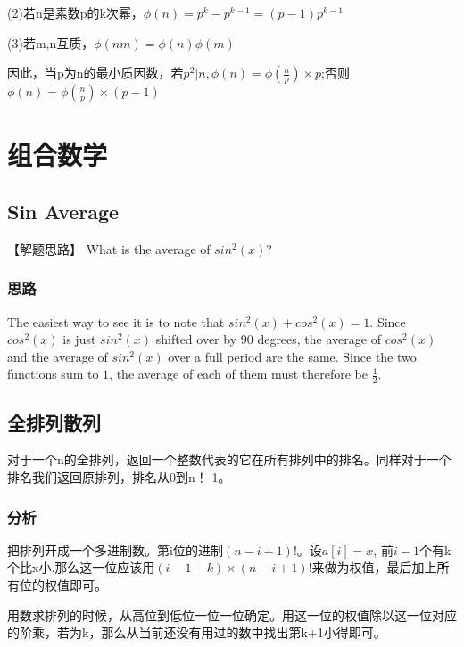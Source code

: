 (2)若n是素数p的k次幂，$\phi(n)=p^k-p^{k-1}=(p-1)p^{k-1}$

(3)若m,n互质，$\phi(nm)=\phi(n)\phi(m)$

因此，当p为n的最小质因数，若$p^2|n,\phi(n)=\phi(\frac{n}{p})\times p$;否则$\phi(n)=\phi(\frac{n}{p})\times (p-1)$

\section{组合数学} %

\subsection{Sin Average}
【解题思路】
What is the average of $sin^2(x)$?
\subsubsection{思路}
The easiest way to see it is to note that $sin^2(x)+cos^2(x)=1$. Since $cos^2(x)$ is just $sin^2(x)$ shifted over by $90$ degrees, the average of $cos^2(x)$ and the average of 
$sin^2(x)$ over a full period are the same. Since the two functions sum to $1$, the average of each of them must therefore be $\frac{1}{2}$.

\subsection{全排列散列}
对于一个n的全排列，返回一个整数代表的它在所有排列中的排名。同样对于一个排名我们返回原排列，排名从0到n！-1。

\subsubsection{分析}
把排列开成一个多进制数。第i位的进制$(n-i+1)!$。设$a[i]=x$, 前$i-1$个有k个比x小.那么这一位应该用$(i-1-k)\times(n-i+1)!$来做为权值，最后加上所有位的权值即可。

用数求排列的时候，从高位到低位一位一位确定。用这一位的权值除以这一位对应的阶乘，若为k，那么从当前还没有用过的数中找出第k+1小得即可。